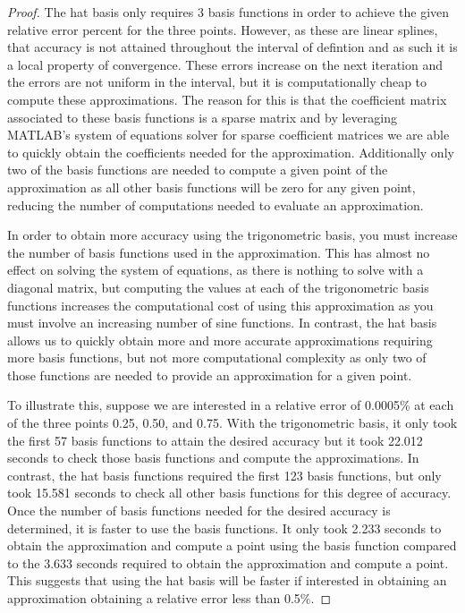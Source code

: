 \begin{proof}
  The hat basis only requires 3 basis functions in order to achieve the given relative error percent
  for the three points. However, as these are linear splines, that accuracy is not attained throughout
  the interval of defintion and as such it is a local property of convergence.
  These errors increase on the next iteration and the errors are not uniform in the
  interval, but it is computationally cheap to compute these approximations.
  The reason for this is that the coefficient matrix
  associated to these basis functions is a sparse matrix and by leveraging MATLAB's system of
  equations solver for sparse coefficient matrices we are able to quickly obtain the
  coefficients needed for the approximation. Additionally only two of the basis functions
  are needed to compute a given point of the approximation as all other basis
  functions will be zero for any given point, reducing the number of computations
  needed to evaluate an approximation.

  In order to obtain more accuracy using the trigonometric basis, you must increase
  the number of basis functions used in the approximation. This has almost no effect on
  solving the system of equations, as there is nothing to solve with a diagonal matrix,
  but computing the values at each of the trigonometric basis functions increases the computational
  cost of using this approximation as you must involve an increasing number of sine functions.
  In contrast, the hat basis allows us to quickly obtain more and more accurate approximations
  requiring more basis functions, but not more computational complexity as only
  two of those functions are needed to provide an approximation for a given point.

  To illustrate this, suppose we are interested in a relative error of 0.0005\%
  at each of the three points 0.25, 0.50, and 0.75. With the trigonometric basis,
  it only took the first 57 basis functions to attain the desired accuracy
  but it took 22.012 seconds to check those basis functions and compute the approximations.
  In contrast, the hat basis functions required the first 123 basis functions,
  but only took 15.581 seconds to check all other basis functions for this degree of accuracy.
  Once the number of basis functions needed for the desired accuracy is determined,
  it is faster to use the basis functions. It only took 2.233 seconds to obtain the
  approximation and compute a point using the basis function compared to the
  3.633 seconds required to obtain the approximation and compute a point. This
  suggests that using the hat basis will be faster if interested in obtaining
  an approximation obtaining a relative error less than 0.5\%.


\end{proof}
